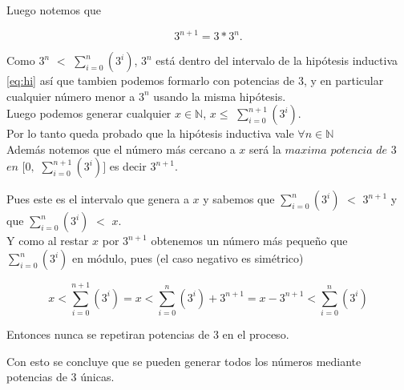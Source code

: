 Luego notemos que 

\begin{equation}
3^{n+1} = 3 \ast 3^n. 
\end{equation}

Como $3^n$ $<$ $\sum_{i=0}^{n}(3^i)$, $3^n$ está dentro del intervalo de la hipótesis inductiva \eqref{eq:hi} así que tambien podemos formarlo con potencias de 3, y en particular cualquier número menor a $3^n$ usando la misma hipótesis. \\

Luego podemos generar cualquier $x \in \mathbb{N}$, $x \leq$ $\sum_{i=0}^{n+1}(3^i)$. \\

Por lo tanto queda probado que la hipótesis inductiva vale $\forall n \in \mathbb{N}$ \\

Además notemos que el número más cercano a $x$ será la $maxima$ $potencia$ $de$ $3$ $en$ $[0, $ $\sum_{i=0}^{n+1}(3^i)]$ es decir $3^{n+1}$.
 
Pues este es el intervalo que genera a $x$ y sabemos que $\sum_{i=0}^{n}(3^i)$ $<$ $3^{n+1}$ y que
$\sum_{i=0}^{n}(3^i)$ $<$ $x$.\\

Y como al restar $x$ por $3^{n+1}$ obtenemos un número más pequeño que $\sum_{i=0}^{n}(3^i)$ en módulo, pues (el caso negativo es simétrico)

\begin{equation}
x < \sum_{i=0}^{n+1}(3^i) =
x < \sum_{i=0}^{n}(3^i) + 3^{n+1} =
x - 3^{n+1} < \sum_{i=0}^{n}(3^i) 
\end{equation}

Entonces nunca se repetiran potencias de 3 en el proceso.

Con esto se concluye que se pueden generar todos los números mediante potencias de 3 únicas.